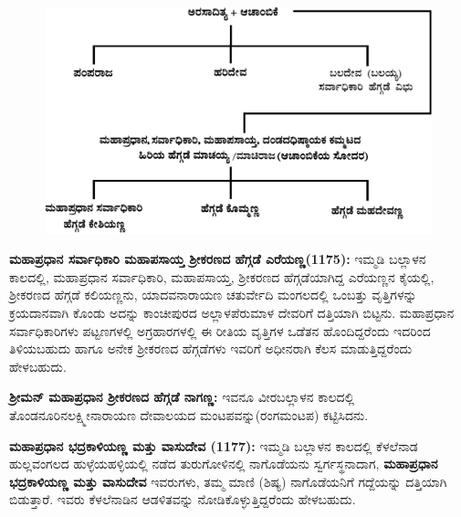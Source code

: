 \begin{figure}[H]
\includegraphics[scale=1.25]{images/chap3/chap3fig26.jpeg}
\end{figure}

\textbf{ಮಹಾಪ್ರಧಾನ ಸರ್ವಾಧಿಕಾರಿ ಮಹಾಪಸಾಯ್ತ ಶ‍್ರೀಕರಣದ ಹೆಗ್ಗಡೆ ಎರೆಯಣ್ಣ(1175):} ಇಮ್ಮಡಿ ಬಲ್ಲಾಳನ ಕಾಲದಲ್ಲಿ, ಮಹಾಪ್ರಧಾನ ಸರ್ವಾಧಿಕಾರಿ, ಮಹಾಪಸಾಯ್ತ, ಶ‍್ರೀಕರಣದ ಹೆಗ್ಗಡೆಯಾಗಿದ್ದ ಎರೆಯಣ್ಣನ ಕೈಯಲ್ಲಿ, ಶ‍್ರೀಕರಣದ ಹೆಗ್ಗಡೆ ಕಲಿಯಣ್ಣನು, ಯಾದವನಾರಾಯಣ ಚತುರ್ವೇದಿ ಮಂಗಲದಲ್ಲಿ ಒಂಬತ್ತು ವೃತ್ತಿಗಳನ್ನು ಕ್ರಯದಾನವಾಗಿ ಕೊಂಡು ಅದನ್ನು ಕಾಂಚೀಪುರದ ಅಲ್ಲಾಳಪೆರುಮಾಳ ದೇವರಿಗೆ ದತ್ತಿಯಾಗಿ ಬಿಟ್ಟನು. ಮಹಾಪ್ರಧಾನ ಸರ್ವಾಧಿಕಾರಿಗಳು ಪಟ್ಟಣಗಳಲ್ಲಿ ಅಗ್ರಹಾರಗಳಲ್ಲಿ ಈ ರೀತಿಯ ವೃತ್ತಿಗಳ ಒಡೆತನ ಹೊಂದಿದ್ದರೆಂದು ಇದರಿಂದ ತಿಳಿಯಬಹುದು ಹಾಗೂ ಅನೇಕ ಶ‍್ರೀಕರಣದ ಹೆಗ್ಗಡೆಗಳು ಇವರಿಗೆ ಅಧೀನರಾಗಿ ಕೆಲಸ ಮಾಡುತ್ತಿದ್ದರೆಂದು ಹೇಳಬಹುದು.

\textbf{ಶ‍್ರೀಮನ್​ ಮಹಾಪ್ರಧಾನ ಶ‍್ರೀಕರಣದ ಹೆಗ್ಗಡೆ ನಾಗಣ್ಣ:} ಇವನೂ ವೀರಬಲ್ಲಾಳನ ಕಾಲದಲ್ಲಿ ತೊಂಡನೂರಿನ\break ಲಕ್ಷ್ಮೀನಾರಾಯಣ ದೇವಾಲಯದ ಮಂಟಪವನ್ನು(ರಂಗಮಂಟಪ) ಕಟ್ಟಿಸಿದನು.

\textbf{ಮಹಾಪ್ರಧಾನ ಭದ್ರಕಾಳಿಯಣ್ಣ ಮತ್ತು ವಾಸುದೇವ (1177):} ಇಮ್ಮಡಿ ಬಲ್ಲಾಳನ ಕಾಲದಲ್ಲಿ ಕೆಳಲೆನಾಡ ಹುಲ್ಲವಂಗಲದ ಹುಳ್ಳೆಯಹಳ್ಳಿಯಲ್ಲಿ ನಡೆದ ತುರುಗೋಳಿನಲ್ಲಿ ನಾಗೊಡೆಯನು ಸ್ವರ್ಗಸ್ಥನಾದಾಗ, \textbf{ಮಹಾಪ್ರಧಾನ ಭದ್ರಕಾಳಿಯಣ್ಣ ಮತ್ತು ವಾಸುದೇವ} ಇವರುಗಳು, ತಮ್ಮ ಮಾಣಿ (ಶಿಷ್ಯ) ನಾಗೊಡೆಯನಿಗೆ ಗದ್ದೆಯನ್ನು ದತ್ತಿಯಾಗಿ ಬಿಡುತ್ತಾರೆ. ಇವರು ಕೆಳಲೆನಾಡಿನ ಆಡಳಿತವನ್ನು ನೋಡಿಕೊಳ್ಳುತ್ತಿದ್ದರೆಂದು ಹೇಳಬಹುದು.

